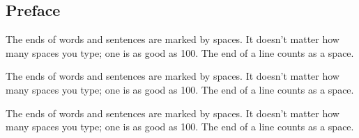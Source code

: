 \cleardoublepage
\begin{frontmatter}
\chapter*{Preface}%
\end{frontmatter}


 The ends of words and sentences are marked by spaces. It doesn't
 matter how many spaces you type; one is as good as 100.  The end of
 a line counts as a space.

 The ends of words and sentences are marked by spaces. It doesn't
 matter how many spaces you type; one is as good as 100.  The end of
 a line counts as a space.

 The ends of words and sentences are marked by spaces. It doesn't
 matter how many spaces you type; one is as good as 100.  The end of
 a line counts as a space.

\source%
{%
  \author{Name}\\%
}
